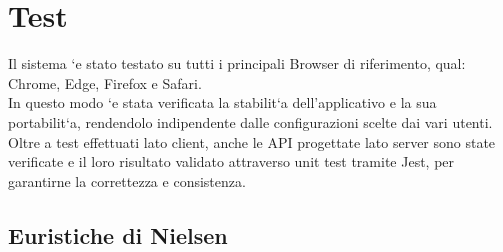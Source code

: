 \section{Test}
Il sistema `e stato testato su tutti i principali Browser di riferimento, qual: Chrome, Edge, Firefox e Safari.\\
In questo modo `e stata verificata la stabilit`a dell’applicativo e la sua portabilit`a, rendendolo indipendente dalle
configurazioni scelte dai vari utenti.\\ Oltre a test effettuati lato client, anche le API progettate lato server sono
state verificate e il loro risultato validato attraverso unit test tramite Jest, per garantirne la correttezza e consistenza.
\subsection{Euristiche di Nielsen}

